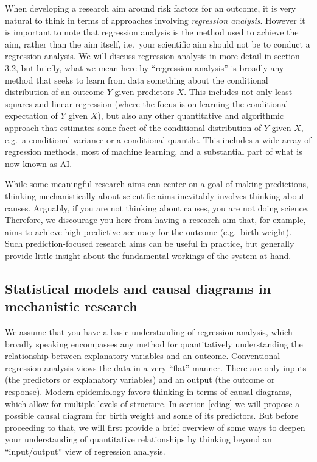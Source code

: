 When developing a research aim around risk factors for an outcome, it is very natural to think in terms of approaches involving {\em regression analysis}.  However it is important to note that regression analysis is the method used to achieve the aim, rather than the aim itself, i.e.\ your scientific aim should not be to conduct a regression analysis.  We will discuss regression analysis in more detail in section 3.2, but briefly, what we mean here by ``regression analysis'' is broadly any method that seeks to learn from data something about the conditional distribution of an outcome $Y$ given predictors $X$.  This includes not only least squares and linear regression (where the focus is on learning the conditional expectation of $Y$ given $X$), but also any other quantitative and algorithmic approach that estimates some facet of the conditional distribution of $Y$ given $X$, e.g.\ a conditional variance or a conditional quantile.  This includes a wide array of regression methods, most of machine learning, and a substantial part of what is now known as AI.

While some meaningful research aims can center on a goal of making predictions, thinking mechanistically about scientific aims inevitably involves thinking about causes.  Arguably, if you are not thinking about causes, you are not doing science.  Therefore, we discourage you here from having a research aim that, for example, aims to achieve high predictive accuracy for the outcome (e.g.\ birth weight).  Such prediction-focused research aims can be useful in practice, but generally provide little insight about the fundamental workings of the system at hand.

\subsection{Statistical models and causal diagrams in mechanistic research}

We assume that you have a basic understanding of regression analysis, which broadly speaking encompasses any method for quantitatively understanding the relationship between explanatory variables and an outcome.  Conventional regression analysis views the data in a very ``flat'' manner.  There are only inputs (the predictors or explanatory variables) and an output (the outcome or response). Modern epidemiology favors thinking in terms of causal diagrams, which allow for multiple levels of structure.  In section \ref{cdiag} we will propose a possible causal diagram for birth weight and some of its predictors.  But before proceeding to that, we will first provide a brief overview of some ways to deepen your understanding of quantitative relationships by thinking beyond an ``input/output'' view of regression analysis.

